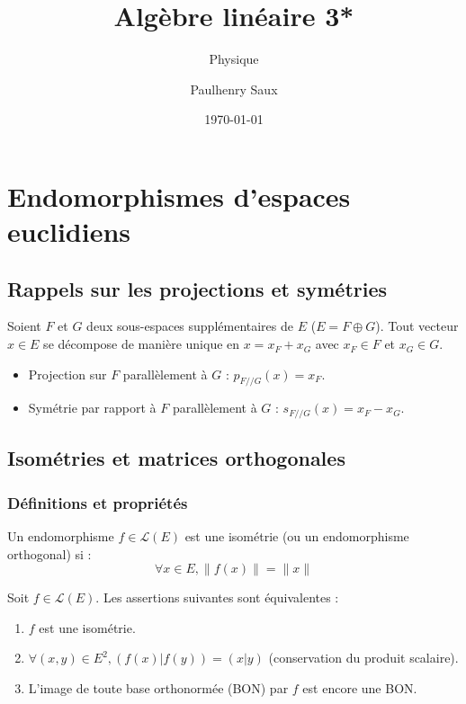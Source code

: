 \documentclass[french]{yLectureNote}
\title{Algèbre linéaire 3*}
\subtitle{Physique}
\author{Paulhenry Saux}
\date{\today}
\begin{document}
\setcounter{chapter}{1}


\chapter{Endomorphismes d'espaces euclidiens}

\section{Rappels sur les projections et symétries}
Soient $F$ et $G$ deux sous-espaces supplémentaires de $E$ ($E = F \oplus G$). Tout vecteur $x \in E$ se décompose de manière unique en $x = x_F + x_G$ avec $x_F \in F$ et $x_G \in G$.

\begin{itemize}
    \item Projection sur $F$ parallèlement à $G$ : $p_{F//G}(x) = x_F$.
    \item Symétrie par rapport à $F$ parallèlement à $G$ : $s_{F//G}(x) = x_F - x_G$.
\end{itemize}


\section{Isométries et matrices orthogonales}

\subsection{Définitions et propriétés}

\begin{definition}
    Un endomorphisme $f \in \mathcal{L}(E)$ est une isométrie (ou un endomorphisme orthogonal) si :
    $$\forall x \in E, \|f(x)\| = \|x\|$$
\end{definition}

\begin{proposition}
    Soit $f \in \mathcal{L}(E)$. Les assertions suivantes sont équivalentes :
    \begin{enumerate}
        \item $f$ est une isométrie.
        \item $\forall (x,y) \in E^2, (f(x)|f(y)) = (x|y)$ (conservation du produit scalaire).
        \item L'image de toute base orthonormée (BON) par $f$ est encore une BON.
    \end{enumerate}
\end{proposition}
\end{document}
